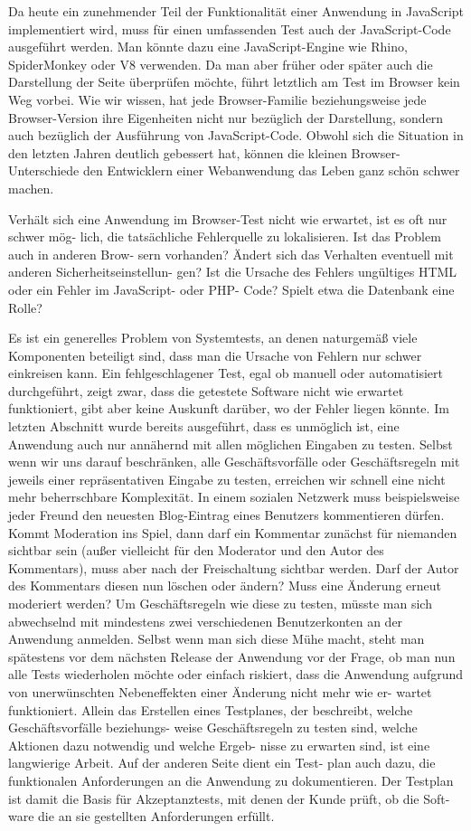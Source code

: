 Da heute ein zunehmender Teil der Funktionalität einer Anwendung in JavaScript implementiert 
wird, muss für einen umfassenden Test auch der JavaScript-Code ausgeführt werden. 
Man könnte dazu eine JavaScript-Engine wie Rhino, SpiderMonkey oder V8 verwenden.
Da man aber früher oder später auch die Darstellung der Seite überprüfen möchte,
führt letztlich am Test im Browser kein Weg vorbei. Wie wir wissen, hat jede 
Browser-Familie beziehungsweise jede Browser-Version ihre Eigenheiten nicht nur bezüglich der
Darstellung, sondern auch bezüglich der Ausführung von JavaScript-Code. Obwohl sich
die Situation in den letzten Jahren deutlich gebessert hat, können die kleinen Browser-
Unterschiede den Entwicklern einer Webanwendung das Leben ganz schön schwer machen.

Verhält sich eine Anwendung im Browser-Test nicht wie erwartet, ist es oft nur schwer mög-
lich, die tatsächliche Fehlerquelle zu lokalisieren. Ist das Problem auch in anderen Brow-
sern vorhanden? Ändert sich das Verhalten eventuell mit anderen Sicherheitseinstellun-
gen? Ist die Ursache des Fehlers ungültiges HTML oder ein Fehler im JavaScript- oder PHP-
Code? Spielt etwa die Datenbank eine Rolle?

Es ist ein generelles Problem von Systemtests, an denen naturgemäß viele Komponenten
beteiligt sind, dass man die Ursache von Fehlern nur schwer einkreisen kann. Ein fehlgeschlagener
Test, egal ob manuell oder automatisiert durchgeführt, zeigt zwar, dass die getestete
Software nicht wie erwartet funktioniert, gibt aber keine Auskunft darüber, wo der
Fehler liegen könnte.
Im letzten Abschnitt wurde bereits ausgeführt, dass es unmöglich ist, eine Anwendung
auch nur annähernd mit allen möglichen Eingaben zu testen. Selbst wenn wir uns darauf
beschränken, alle Geschäftsvorfälle oder Geschäftsregeln mit jeweils einer repräsentativen
Eingabe zu testen, erreichen wir schnell eine nicht mehr beherrschbare Komplexität. In einem
sozialen Netzwerk muss beispielsweise jeder Freund den neuesten Blog-Eintrag eines
Benutzers kommentieren dürfen. Kommt Moderation ins Spiel, dann darf ein Kommentar
zunächst für niemanden sichtbar sein (außer vielleicht für den Moderator und den Autor
des Kommentars), muss aber nach der Freischaltung sichtbar werden. Darf der Autor
des Kommentars diesen nun löschen oder ändern? Muss eine Änderung erneut moderiert
werden?
Um Geschäftsregeln wie diese zu testen, müsste man sich abwechselnd mit mindestens
zwei verschiedenen Benutzerkonten an der Anwendung anmelden. Selbst wenn man sich
diese Mühe macht, steht man spätestens vor dem nächsten Release der Anwendung vor
der Frage, ob man nun alle Tests wiederholen möchte oder einfach riskiert, dass die 
Anwendung aufgrund von unerwünschten Nebeneffekten einer Änderung nicht mehr wie er-
wartet funktioniert.
Allein das Erstellen eines Testplanes, der beschreibt, welche Geschäftsvorfälle beziehungs-
weise Geschäftsregeln zu testen sind, welche Aktionen dazu notwendig und welche Ergeb-
nisse zu erwarten sind, ist eine langwierige Arbeit. Auf der anderen Seite dient ein Test-
plan auch dazu, die funktionalen Anforderungen an die Anwendung zu dokumentieren.
Der Testplan ist damit die Basis für Akzeptanztests, mit denen der Kunde prüft, ob die Soft-
ware die an sie gestellten Anforderungen erfüllt.

